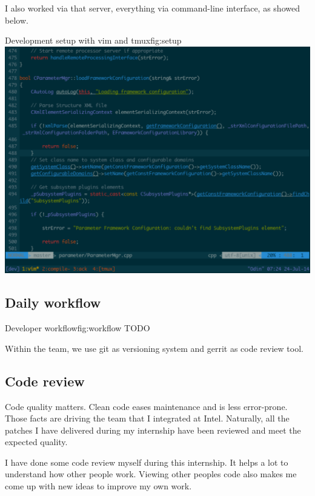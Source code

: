 I also worked via that server, everything via command-line interface, as showed below.
\begin{figureGraphics}{Development setup with vim and tmux}{fig:setup}
\includegraphics[width=\textwidth]{./src/img/setup.pdf}
\end{figureGraphics}

\subsection{Daily workflow}

\begin{figureGraphics}{Developer workflow}{fig:workflow}
    TODO
\end{figureGraphics}

Within the team, we use \gls{git} as versioning system and \gls{gerrit} as code review tool.


\subsection{Code review}
Code quality matters. Clean code eases maintenance and is less error-prone.
Those facts are driving the team that I integrated at Intel. Naturally, all the
patches I have delivered during my internship have been reviewed and meet the
expected quality.

I have done some code review myself during this internship. It helps a lot to
understand how other people work. Viewing other peoples code also makes me come
up with new ideas to improve my own work.
